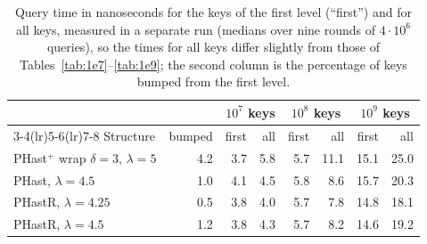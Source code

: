 \documentclass[11pt]{article}
\newcommand{\PHast}{PHast\xspace}
\newcommand{\PHastP}{PHast$^+$\xspace}
\newcommand{\PHastR}{PHastR\xspace}
\begin{document}
\begin{table}[t]
\centering
\caption{Query time in nanoseconds for the keys of the first level
(``first'') and for all keys, measured in a separate run (medians over nine
rounds of $4\cdot10^6$ queries), so the times for all keys differ slightly
from those of Tables~\ref{tab:1e7}--\ref{tab:1e9}; the second column is the
percentage of keys bumped from the first level.}
\label{tab:split}
\small
\begin{tabular}{lrrrrrrr}
\toprule
& & \multicolumn{2}{c}{$10^7$ keys} & \multicolumn{2}{c}{$10^8$ keys} & \multicolumn{2}{c}{$10^9$ keys} \\
\cmidrule(lr){3-4}\cmidrule(lr){5-6}\cmidrule(lr){7-8}
Structure & bumped & first & all & first & all & first & all \\
\midrule
\PHastP wrap $\delta=3$, $\lambda=5$ & 4.2 & 3.7 & 5.8 & 5.7 & 11.1 & 15.1 & 25.0 \\
\PHast, $\lambda=4.5$ & 1.0 & 4.1 & 4.5 & 5.8 & 8.6 & 15.7 & 20.3 \\
\PHastR, $\lambda=4.25$ & 0.5 & 3.8 & 4.0 & 5.7 & 7.8 & 14.8 & 18.1 \\
\PHastR, $\lambda=4.5$ & 1.2 & 3.8 & 4.3 & 5.7 & 8.2 & 14.6 & 19.2 \\
\bottomrule
\end{tabular}
\end{table}
\end{document}
